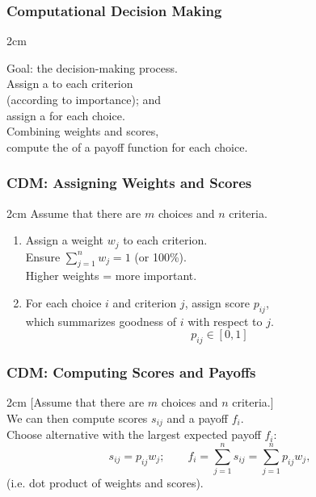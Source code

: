 \begin{frame}
\frametitle{Computational Decision Making}

\begin{changemargin}{2cm}

Goal:  the decision-making process.\\[1em]

Assign a  to each criterion \\ \qquad (according to importance); and\\
assign a  for each choice.\\[1em]

Combining weights and scores,\\
compute the  of
a payoff function for each choice.

\end{changemargin}

\end{frame}

\begin{frame}
\frametitle{CDM: Assigning Weights and Scores}

\begin{changemargin}{2cm}
Assume that there are $m$ choices and $n$ criteria. 
\begin{enumerate}
\item Assign a weight
  $w_j$ to each criterion. \\
  Ensure $\sum_{j=1}^n w_j = 1$ (or
  100\%). \\ Higher weights = more important.\\[1em]
\item For each choice $i$ and criterion $j$, assign score $p_{ij}$,\\
  which summarizes goodness of $i$ with respect to $j$.\\

  \[ p_{ij} \in [0, 1] \]
\end{enumerate}
\end{changemargin}
\end{frame}

\begin{frame}
\frametitle{CDM: Computing Scores and Payoffs}

\begin{changemargin}{2cm}
[Assume that there are $m$ choices and $n$ criteria.]\\[1em]

We can then compute scores $s_{ij}$ and a payoff $f_i$.\\

Choose alternative with
the largest expected payoff $f_i$:
\[ s_{ij} = p_{ij} w_j; \qquad f_i = \sum_{j=1}^n s_{ij} = \sum_{j=1}^n p_{ij} w_j, \]
(i.e. dot product of weights and scores).

\end{changemargin}

\end{frame}

